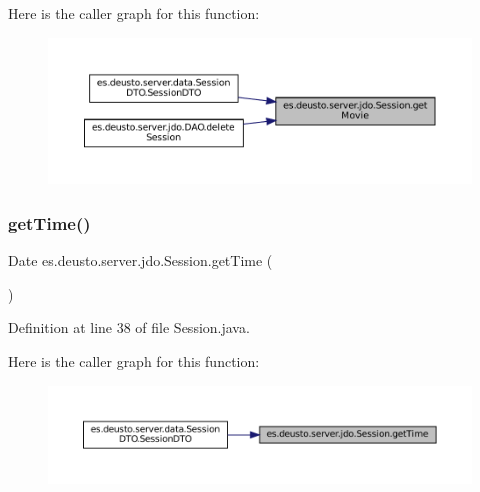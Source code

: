 Here is the caller graph for this function\+:\nopagebreak
\begin{figure}[H]
\begin{center}
\leavevmode
\includegraphics[width=350pt]{classes_1_1deusto_1_1server_1_1jdo_1_1_session_afdae557964a51e2d6b037db206b344c1_icgraph}
\end{center}
\end{figure}
\mbox{\label{classes_1_1deusto_1_1server_1_1jdo_1_1_session_aa2855c0e0f810bc64c6c84fbfab2f977}} 
\subsubsection{\texorpdfstring{getTime()}{getTime()}}
{\footnotesize\ttfamily Date es.\+deusto.\+server.\+jdo.\+Session.\+get\+Time (\begin{DoxyParamCaption}{ }\end{DoxyParamCaption})}



Definition at line 38 of file Session.\+java.

Here is the caller graph for this function\+:\nopagebreak
\begin{figure}[H]
\begin{center}
\leavevmode
\includegraphics[width=350pt]{classes_1_1deusto_1_1server_1_1jdo_1_1_session_aa2855c0e0f810bc64c6c84fbfab2f977_icgraph}
\end{center}
\end{figure}
\mbox{\label{classes_1_1deusto_1_1server_1_1jdo_1_1_session_ae4e58ddc0ec278e4f16eba20755b5ceb}} 
